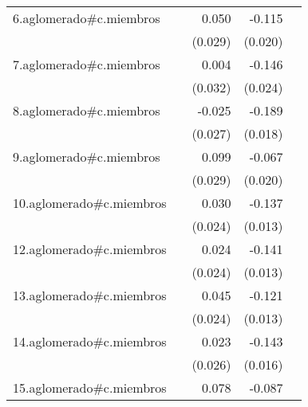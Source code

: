 {\begin{longtable}{l*{4}{D{.}{.}{-1}}}
\addlinespace
6.aglomerado#c.miembros&                     &       0.050         &      -0.115\sym{***}&                     \\
            &                     &     (0.029)         &     (0.020)         &                     \\
\addlinespace
7.aglomerado#c.miembros&                     &       0.004         &      -0.146\sym{***}&                     \\
            &                     &     (0.032)         &     (0.024)         &                     \\
\addlinespace
8.aglomerado#c.miembros&                     &      -0.025         &      -0.189\sym{***}&                     \\
            &                     &     (0.027)         &     (0.018)         &                     \\
\addlinespace
9.aglomerado#c.miembros&                     &       0.099\sym{***}&      -0.067\sym{**} &                     \\
            &                     &     (0.029)         &     (0.020)         &                     \\
\addlinespace
10.aglomerado#c.miembros&                     &       0.030         &      -0.137\sym{***}&                     \\
            &                     &     (0.024)         &     (0.013)         &                     \\
\addlinespace
12.aglomerado#c.miembros&                     &       0.024         &      -0.141\sym{***}&                     \\
            &                     &     (0.024)         &     (0.013)         &                     \\
\addlinespace
13.aglomerado#c.miembros&                     &       0.045         &      -0.121\sym{***}&                     \\
            &                     &     (0.024)         &     (0.013)         &                     \\
\addlinespace
14.aglomerado#c.miembros&                     &       0.023         &      -0.143\sym{***}&                     \\
            &                     &     (0.026)         &     (0.016)         &                     \\
\addlinespace
15.aglomerado#c.miembros&                     &       0.078\sym{**} &      -0.087\sym{***}&                     \\

\end{longtable}}

